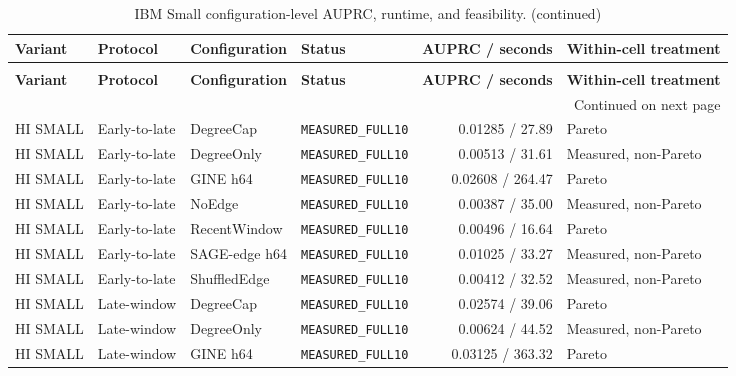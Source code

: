\begingroup
\footnotesize
\setlength{\tabcolsep}{3pt}
\renewcommand{\arraystretch}{1.10}
\begin{longtable}{@{}p{} p{} p{} p{} r p{}@{}}
\caption{IBM Small configuration-level AUPRC, runtime, and feasibility.}\label{tab:s-ibm-runtime-small}\\
\toprule
\textbf{Variant} & \textbf{Protocol} & \textbf{Configuration} & \textbf{Status} & \textbf{AUPRC / seconds} & \textbf{Within-cell treatment} \\
\midrule
\endfirsthead
\caption[]{IBM Small configuration-level AUPRC, runtime, and feasibility. (continued)}\\
\toprule
\textbf{Variant} & \textbf{Protocol} & \textbf{Configuration} & \textbf{Status} & \textbf{AUPRC / seconds} & \textbf{Within-cell treatment} \\
\midrule
\endhead
\midrule
\multicolumn{6}{r}{\footnotesize Continued on next page}\\
\endfoot
\bottomrule
\endlastfoot
HI SMALL & Early-to-late & DegreeCap & \texttt{MEASURED\_\allowbreak{}FULL10} & 0.01285 / 27.89 & Pareto \\
HI SMALL & Early-to-late & DegreeOnly & \texttt{MEASURED\_\allowbreak{}FULL10} & 0.00513 / 31.61 & Measured, non-Pareto \\
HI SMALL & Early-to-late & GINE h64 & \texttt{MEASURED\_\allowbreak{}FULL10} & 0.02608 / 264.47 & Pareto \\
HI SMALL & Early-to-late & NoEdge & \texttt{MEASURED\_\allowbreak{}FULL10} & 0.00387 / 35.00 & Measured, non-Pareto \\
HI SMALL & Early-to-late & RecentWindow & \texttt{MEASURED\_\allowbreak{}FULL10} & 0.00496 / 16.64 & Pareto \\
HI SMALL & Early-to-late & SAGE-edge h64 & \texttt{MEASURED\_\allowbreak{}FULL10} & 0.01025 / 33.27 & Measured, non-Pareto \\
HI SMALL & Early-to-late & ShuffledEdge & \texttt{MEASURED\_\allowbreak{}FULL10} & 0.00412 / 32.52 & Measured, non-Pareto \\
HI SMALL & Late-window & DegreeCap & \texttt{MEASURED\_\allowbreak{}FULL10} & 0.02574 / 39.06 & Pareto \\
HI SMALL & Late-window & DegreeOnly & \texttt{MEASURED\_\allowbreak{}FULL10} & 0.00624 / 44.52 & Measured, non-Pareto \\
HI SMALL & Late-window & GINE h64 & \texttt{MEASURED\_\allowbreak{}FULL10} & 0.03125 / 363.32 & Pareto \\

\end{longtable}
